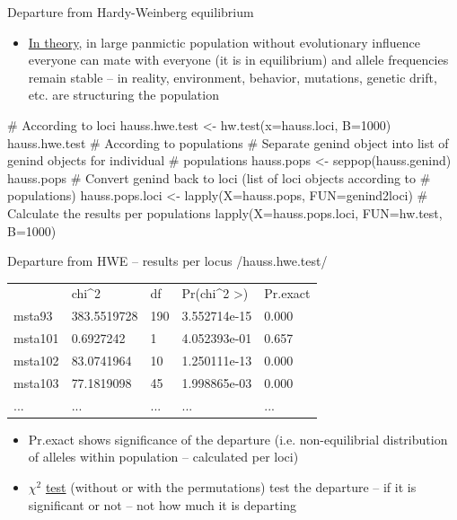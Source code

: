 \documentclass[compress, ucs, xelatex, 11pt, xcolor=svgnames,
  hyperref={
    bookmarks=true,
    unicode=true,
    colorlinks=true,
    pdftitle={Molecular data in R},
    plainpages=false,
    pdfauthor={Vojtech Zeisek},
    pdfsubject={Course about phylogeny and evolution in R},
    pdfcreator={XeLaTeX},
    pdfkeywords={R, evolution, phylogeny, molecular data},
    linkcolor=Tomato,
    anchorcolor=SaddleBrown,
    citecolor=Goldenrod,
    filecolor=DarkMagenta,
    menucolor=Sienna,
    urlcolor=DarkTurquoise,
    pdftex},
  url={hyphens, lowtilde} %
  ]{beamer}
\begin{document}
\begin{frame}[fragile]{Departure from Hardy-Weinberg equilibrium}
  \begin{itemize}
    \item \href{https://en.wikipedia.org/wiki/Hardy%E2%80%93Weinberg_principle}{In theory}, in large panmictic population without evolutionary influence everyone can mate with everyone (it is in equilibrium) and allele frequencies remain stable -- in reality, environment, behavior, mutations, genetic drift, etc. are structuring the population
  \end{itemize}
  \begin{spluscode}
    # According to loci
    hauss.hwe.test <- hw.test(x=hauss.loci, B=1000)
    hauss.hwe.test
    # According to populations
    # Separate genind object into list of genind objects for individual
    # populations
    hauss.pops <- seppop(hauss.genind)
    hauss.pops
    # Convert genind back to loci (list of loci objects according to
    # populations)
    hauss.pops.loci <- lapply(X=hauss.pops, FUN=genind2loci)
    # Calculate the results per populations
    lapply(X=hauss.pops.loci, FUN=hw.test, B=1000)
  \end{spluscode}
\end{frame}

\begin{frame}[fragile]{Departure from HWE -- results per locus}
  \vfill
  \splus/hauss.hwe.test/
  \begin{tabular}{lllll}
    & chi\textasciicircum2 & df & Pr(chi\textasciicircum2 >) & Pr.exact\\
    msta93 & 383.5519728 & 190 & 3.552714e-15 & 0.000\\
    msta101 & 0.6927242 & 1 & 4.052393e-01 & 0.657\\
    msta102 & 83.0741964 & 10 & 1.250111e-13 & 0.000\\
    msta103 & 77.1819098 & 45 & 1.998865e-03 & 0.000\\
    ... & ... & ... & ... & ...
  \end{tabular}
  \vfill
  \begin{itemize}
    \item Pr.exact shows significance of the departure (i.e. non-equilibrial distribution of alleles within population -- calculated per loci)
    \item $\chi^2$ \href{https://en.wikipedia.org/wiki/Pearson%27s_chi-squared_test}{test} (without or with the permutations) test the departure -- if it is significant or not -- not how much it is departing
  \end{itemize}
  \vfill
\end{frame}
\end{document}
